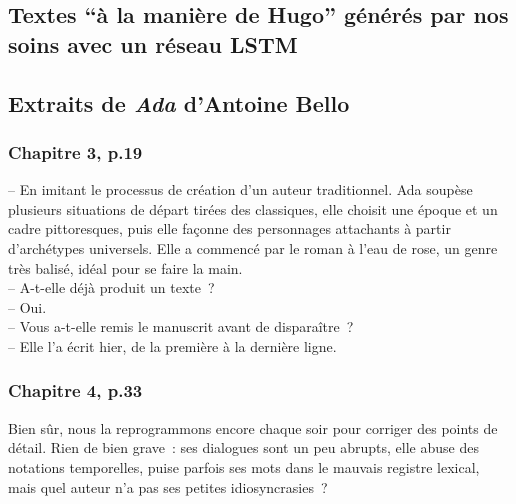 \documentclass{article}
\begin{document}
		\subsection{Textes ``à la manière de Hugo'' générés par nos soins avec un réseau LSTM}\label{lstm_hugo_ex}
		
		\subsection{Extraits de \textit{Ada} d'Antoine Bello}
			
			\subsubsection{Chapitre 3, p.19}\label{ada_elaboration}
				-- En imitant le processus de création d'un auteur traditionnel. Ada soupèse plusieurs situations de départ tirées des classiques, elle choisit une époque et un cadre pittoresques, puis elle façonne des personnages attachants à partir d'archétypes universels. Elle a commencé par le roman à l'eau de rose, un genre très balisé, idéal pour se faire la main.\\
				-- A-t-elle déjà produit un texte~?\\
				-- Oui.\\
				-- Vous a-t-elle remis le manuscrit avant de disparaître~?\\
				-- Elle l'a écrit hier, de la première à la dernière ligne.
			\subsubsection{Chapitre 4, p.33}\label{ada_bug}
				Bien sûr, nous la reprogrammons encore chaque soir pour corriger des points de détail. Rien de bien grave~: ses dialogues sont un peu abrupts, elle abuse des notations temporelles, puise parfois ses mots dans le mauvais registre lexical, mais quel auteur n'a pas ses petites idiosyncrasies~?
\end{document}

